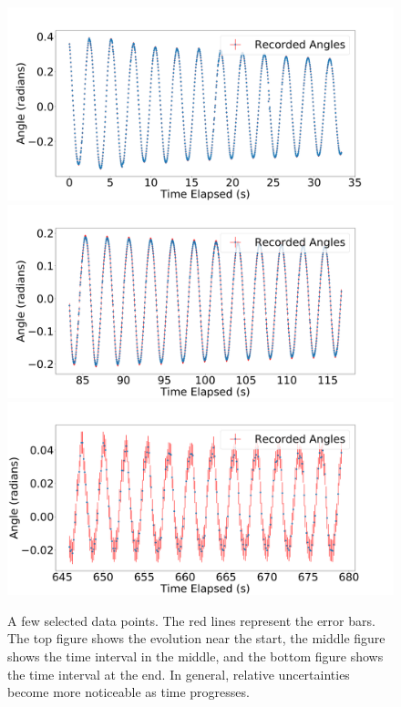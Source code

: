 \documentclass[%
 reprint,
 amsmath,amssymb
 aps,
]{revtex4-2}
\begin{document}
\begin{figure}[!h]
    \includegraphics[width=\linewidth]{figures/first-1000.png}
    \includegraphics[width=\linewidth]{figures/middle-1000.png}
    \includegraphics[width=\linewidth]{figures/last-500.png}

    \caption{A few selected data points. The red lines represent the error bars. The top figure shows the evolution near the start, the middle figure shows the time interval in the middle, and the bottom figure shows the time interval at the end. In general, relative uncertainties become more noticeable as time progresses.}
    \label{fig:intervals}
\end{figure}
\end{document}
